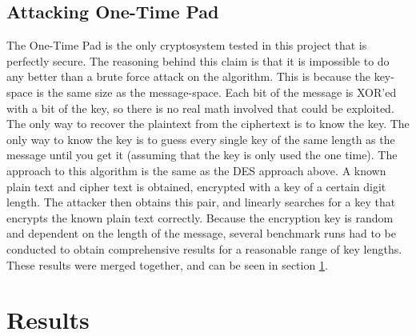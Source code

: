 \documentclass[12pt]{report}
\begin{document}
\subsection{Attacking One-Time Pad}
The One-Time Pad is the only cryptosystem tested in this project that is perfectly secure. The reasoning behind this claim is that it is impossible to do any better
than a brute force attack on the algorithm. This is because the key-space is the same size as the message-space. Each bit of the message is XOR'ed with a bit of the
key, so there is no real math involved that could be exploited. The only way to recover the plaintext from the ciphertext is to know the key. The only way to know
the key is to guess every single key of the same length as the message until you get it (assuming that the key is only used the one time). The approach to this
algorithm is the same as the DES approach above. A known plain text and cipher text is obtained, encrypted with a key of a certain digit length. The attacker then
obtains this pair, and linearly searches for a key that encrypts the known plain text correctly. Because the encryption key is random and dependent on the length of
the message, several benchmark runs had to be conducted to obtain comprehensive results for a reasonable range of key lengths. These results were merged together, and
can be seen in section \ref{results}.

\section{Results}
\label{results}
\end{document}
